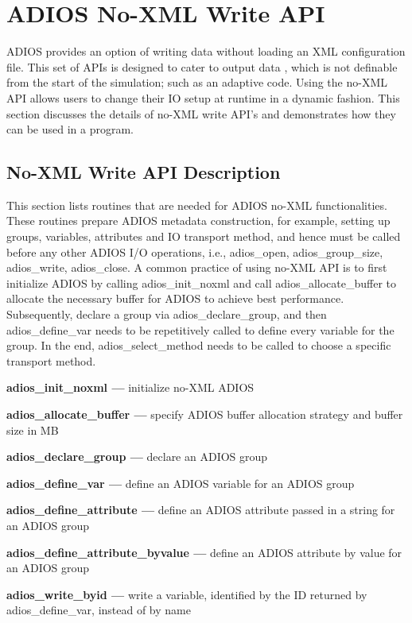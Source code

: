 \chapter{ADIOS No-XML Write API }
\label{chapter-noxml-api}

ADIOS provides an option of writing data without loading an XML configuration file. 
This set of APIs is designed to cater to output data , which is not definable from 
the start of the simulation; such as an adaptive code. Using the no-XML API allows 
users to change their IO setup at runtime in a dynamic fashion.  This section discusses 
the details of no-XML write API's and demonstrates how they can be used in a program. 

\section{No-XML Write API Description}

This section lists routines that are needed for ADIOS no-XML functionalities. These 
routines prepare ADIOS metadata construction, for example, setting up groups, variables, 
attributes and IO transport method, and hence must be called before any other ADIOS 
I/O operations, i.e., adios\_open, adios\_group\_size, adios\_write, adios\_close. 
A common practice of using no-XML API is to first initialize ADIOS by calling 
adios\_init\_noxml 
and call adios\_allocate\_buffer to allocate the necessary buffer for ADIOS to achieve 
best performance. Subsequently, declare a group via adios\_declare\_group, and then 
adios\_define\_var needs to be repetitively called to define every variable 
for the group.  In the end, adios\_select\_method needs to be called to choose 
a specific transport method.

\textbf{adios\_init\_noxml ---} initialize no-XML ADIOS

\textbf{adios\_allocate\_buffer ---} specify ADIOS buffer allocation strategy and 
buffer size in MB

\textbf{adios\_declare\_group ---} declare an ADIOS group 

\textbf{adios\_define\_var ---} define an ADIOS variable for an ADIOS group

\textbf{adios\_define\_attribute ---} define an ADIOS attribute passed in a string for an ADIOS group

\textbf{adios\_define\_attribute\_byvalue ---} define an ADIOS attribute by value for an ADIOS group

\textbf{adios\_write\_byid ---} write a variable, identified by the ID returned by adios\_define\_var, instead of by name

